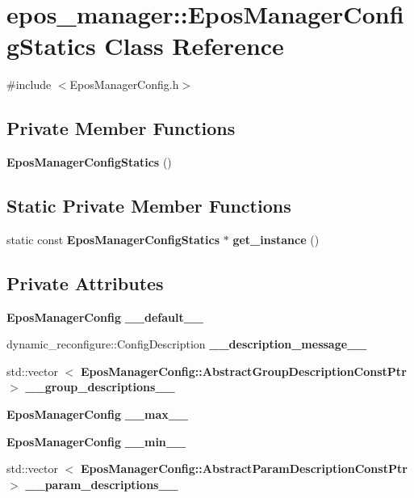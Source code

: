 \section{epos\-\_\-manager\-:\-:\-Epos\-Manager\-Config\-Statics \-Class \-Reference}
\label{classepos__manager_1_1EposManagerConfigStatics}


{\ttfamily \#include $<$\-Epos\-Manager\-Config.\-h$>$}

\subsection*{\-Private \-Member \-Functions}
\begin{DoxyCompactItemize}
\item 
{\bf \-Epos\-Manager\-Config\-Statics} ()
\end{DoxyCompactItemize}
\subsection*{\-Static \-Private \-Member \-Functions}
\begin{DoxyCompactItemize}
\item 
static const \*
{\bf \-Epos\-Manager\-Config\-Statics} $\ast$ {\bf get\-\_\-instance} ()
\end{DoxyCompactItemize}
\subsection*{\-Private \-Attributes}
\begin{DoxyCompactItemize}
\item 
{\bf \-Epos\-Manager\-Config} {\bf \-\_\-\-\_\-default\-\_\-\-\_\-}
\item 
dynamic\-\_\-reconfigure\-::\-Config\-Description {\bf \-\_\-\-\_\-description\-\_\-message\-\_\-\-\_\-}
\item 
std\-::vector\*
$<$ {\bf \-Epos\-Manager\-Config\-::\-Abstract\-Group\-Description\-Const\-Ptr} $>$ {\bf \-\_\-\-\_\-group\-\_\-descriptions\-\_\-\-\_\-}
\item 
{\bf \-Epos\-Manager\-Config} {\bf \-\_\-\-\_\-max\-\_\-\-\_\-}
\item 
{\bf \-Epos\-Manager\-Config} {\bf \-\_\-\-\_\-min\-\_\-\-\_\-}
\item 
std\-::vector\*
$<$ {\bf \-Epos\-Manager\-Config\-::\-Abstract\-Param\-Description\-Const\-Ptr} $>$ {\bf \-\_\-\-\_\-param\-\_\-descriptions\-\_\-\-\_\-}
\end{DoxyCompactItemize}
